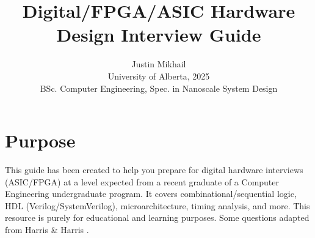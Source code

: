 \documentclass[11pt]{article}
\begin{document}
\title{Digital/FPGA/ASIC Hardware Design Interview Guide}
\author{Justin Mikhail\\University of Alberta, 2025\\BSc. Computer Engineering, Spec. in Nanoscale System Design}
\date{}
\maketitle

\section*{Purpose}
This guide has been created to help you prepare for digital hardware interviews
(ASIC/FPGA) at a level expected from a recent graduate of a Computer
Engineering undergraduate program. It covers combinational/sequential logic,
HDL (Verilog/SystemVerilog), microarchitecture, timing analysis, and more. This
resource is purely for educational and learning purposes. Some questions adapted from
Harris \& Harris \cite{Harris2021}.

\end{document}
